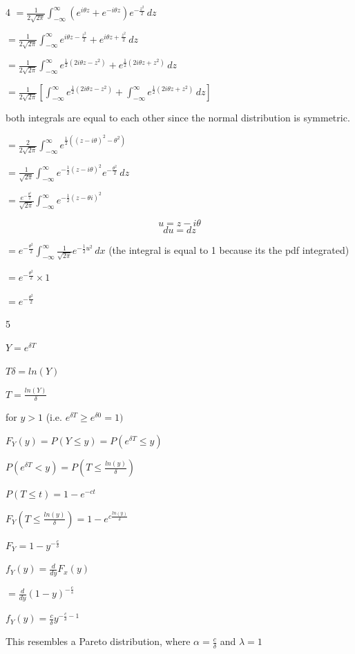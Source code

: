 \documentclass[12 pt]{article}
\begin{document}
\begin{exercise}{4}
     $= \frac{1}{2 \sqrt{2 \pi}} \int_{-\infty}^{\infty}(e^{i\theta z} + e^{-i \theta z}) e^{-\frac{z^2}{2}} \, dz$

     $= \frac{1}{2 \sqrt{2 \pi}} \int_{-\infty}^{\infty} e^{i \theta z - \frac{z^2}{2}} + e^{i \theta z + \frac{z^2}{2}} \, dz$

     $= \frac{1}{2 \sqrt{2 \pi}} \int_{-\infty}^{\infty} e^{\frac{1}{2}(2i \theta z - z^2)} + e^{\frac{1}{2}(2i \theta z + z^2)} \, dz$

     $= \frac{1}{2 \sqrt{2 \pi}}[\int_{-\infty}^{\infty} e^{\frac{1}{2}(2i \theta z - z^2)} + \int_{-\infty}^{\infty} e^{\frac{1}{2}(2i \theta z + z^2)} \, dz]$

     both integrals are equal to each other since the normal distribution is symmetric.

     $= \frac{2}{2\sqrt{2 \pi}} \int_{-\infty}^{\infty} e^{\frac{1}{2}((z-i\theta)^2 - \theta^2)}$

     $= \frac{1}{\sqrt{2 \pi}} \int_{-\infty}^{\infty} e^{-\frac{1}{2}(z-i
     \theta)^2} e^{-\frac{\theta^2}{2}} \, dz$

     $= \frac{e^{-\frac{\theta^2}{2}}}{\sqrt{2 \pi}} \int_{-\infty}^{\infty} e^{-\frac{1}{2}(z-\theta i)^2}$

     $$u = z-i\theta$$
     $$du = dz$$

     $= e^{-\frac{\theta^2}{2}} \int_{-\infty}^{\infty} \frac{1}{\sqrt{2 \pi}} e^{-\frac{1}{2}u^2} \, dx$ (the integral is equal to 1 because its the pdf integrated)

     $= e^{-\frac{\theta^2}{2}} \times 1$

     $= e^{-\frac{\theta^2}{2}}$
 
    \hfill
    \end{exercise}



    \begin{exercise}{5}
    \hfill

    $Y = e^{\delta T}$

    $T \delta = ln(Y)$

    $T = \frac{ln(Y)}{\delta}$

    for $y > 1$ (i.e. $e^{\delta T} \geq e^{\delta 0} = 1)$

    $F_Y(y) = P(Y \leq y) = P(e^{\delta T} \leq y)$

    $P(e^{\delta T} < y) = P(T \leq \frac{ln(y)}{\delta})$

    $P(T \leq t) = 1 - e^{-ct}$

    $F_Y(T \leq \frac{ln(y)}{\delta}) = 1 - e^{c \frac{ln(y)}{\delta}}$

    $F_Y= 1 - y^{-\frac{c}{\delta}}$

    $f_Y(y) = \frac{d}{dy} F_x(y)$

    $= \frac{d}{dy} (1-y)^{-\frac{c}{s}}$

    $f_Y(y) = \frac{c}{\delta}y^{-\frac{c}{\delta} - 1}$

    This resembles a Pareto distribution, where $\alpha = \frac{c}{\delta}$ and $\lambda = 1$
    
    \hfill    
    \end{exercise}
\end{document}
